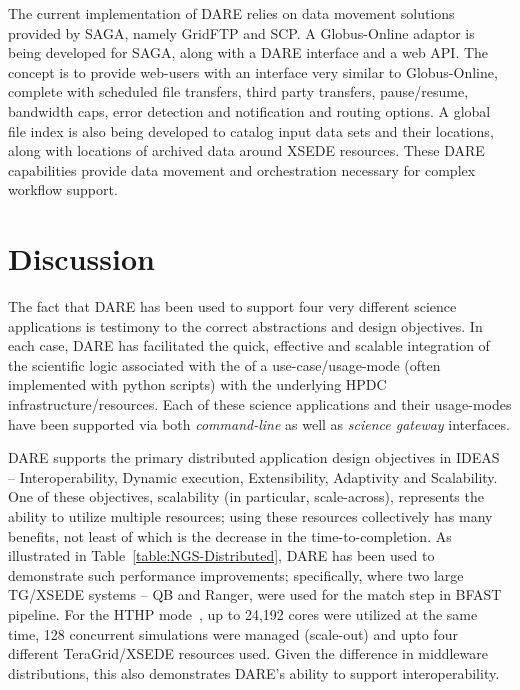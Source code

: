 \documentclass[]{svjour3}
\begin{document}
The current implementation of DARE relies on data movement solutions
provided by SAGA, namely GridFTP and SCP. A Globus-Online adaptor is
being developed for SAGA, along with a DARE interface and a web
API. The concept is to provide web-users with an interface very
similar to Globus-Online, complete with scheduled file transfers,
third party transfers, pause/resume, bandwidth caps, error detection
and notification and routing options. A global file index is also
being developed to catalog input data sets and their locations, along
with locations of archived data around XSEDE resources. These DARE
capabilities provide data movement and orchestration necessary for
complex workflow support.

\section{Discussion}

The fact that DARE has been used to support four very different
science applications is testimony to the correct abstractions and
design objectives. In each case, DARE has facilitated the quick,
effective and scalable integration of the scientific logic associated
with the of a use-case/usage-mode (often implemented with python
scripts) with the underlying HPDC infrastructure/resources. Each of
these science applications and their usage-modes have been supported
via both {\it command-line} as well as {\it science gateway}
interfaces.

DARE supports the primary distributed application design objectives in
IDEAS~\cite{ideas} -- Interoperability, Dynamic execution,
Extensibility, Adaptivity and Scalability. One of these objectives,
scalability (in particular, scale-across), represents the ability to
utilize multiple resources; using these resources collectively has
many benefits, not least of which is the decrease in the
time-to-completion. As illustrated in
Table~\ref{table:NGS-Distributed}, DARE has been used to demonstrate
such performance improvements; specifically, where two large TG/XSEDE
systems -- QB and Ranger, were used for the match step in BFAST
pipeline. For the HTHP mode~\cite{bigjob-ccgrid12}, up to 24,192 cores
were utilized at the same time, 128 concurrent simulations were
managed (scale-out) and upto four different TeraGrid/XSEDE resources
used. Given the difference in middleware distributions, this also
demonstrates DARE's ability to support interoperability.
\end{document}
